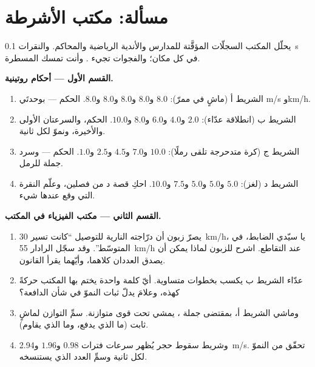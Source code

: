 \section{مسألة: مكتب الأشرطة}

\begin{problem}\label{pb:g9:uniform-varied-motion:1}
يحلّل المكتب السجلّات المؤقَّتة للمدارس والأندية الرياضية
والمحاكم. والنقرات \qty{0.1}{s} في كل مكان؛ والفجوات تجيء
. وأنت تمسك المسطرة.

\medskip\noindent\textbf{القسم الأول --- أحكام روتينية.}
\begin{enumerate}
  \item الشريط أ (ماشٍ في ممرّ): $8.0$ و$8.0$ و$8.0$ و$8.0$
        و$8.0$. الحكم  --- بوحدتَي \unit{m/s}
        و\unit{km/h}.
  \item الشريط ب (انطلاقة عدّاء): $2.0$ و$4.0$ و$6.0$ و$8.0$
        و$10.0$. الحكم، والسرعتان الأولى والأخيرة، ونموّ
         لكل ثانية.
  \item الشريط ج (كرة متدحرجة تلقى رملًا): $10.0$ و$7.0$
        و$4.5$ و$2.5$ و$1.0$. الحكم --- وسرد جملة 
        للرمل.
  \item الشريط د (لغز): $5.0$ و$5.0$ و$5.0$ و$7.5$ و$10.0$.
        احكِ قصة د من فصلين، وعلّم النقرة التي وقع عندها
        شيء.
\end{enumerate}

\medskip\noindent\textbf{القسم الثاني --- مكتب الفيزياء في
المكتب.}
\begin{enumerate}[resume]
  \item يصرّ زبون أن درّاجته النارية للتوصيل ``كانت تسير
        \qty{30}{km/h}، يا سيّدي الضابط، في المتوسّط''. وقد
        سجّل الرادار \qty{55}{km/h} عند التقاطع. اشرح للزبون
        لماذا يمكن أن يصدق العددان كلاهما، وأيّهما يقرأ
        القانون.
  \item عدّاء الشريط ب يكسب  بخطوات متساوية. أيّ كلمة
        واحدة يختم بها المكتب حركةً كهذه، وعلامَ يدلّ ثبات
        النموّ في شأن  الدافعة؟
  \item وماشي الشريط أ، بمقتضى جملة ، يمشي تحت قوى
        متوازنة. سمِّ التوازن لماشٍ ثابت (ما الذي يدفع، وما
        الذي يقاوم).
  \item وشريط سقوط حجر يُظهر سرعات فترات $0.98$ و$1.96$
        و\qty{2.94}{m/s}. تحقّق من النموّ لكل ثانية وسمِّ
        العدد الذي يستنسخه.
\end{enumerate}


\end{problem}
